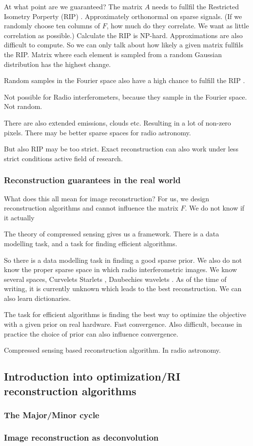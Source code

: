 At what point are we guaranteed? The matrix $A$ needs to fullfil the Restricted Isometry Porperty (RIP) \cite{candes2006robust,donoho2006compressed}.
Approximately orthonormal on sparse signals. (If we randomly choose ten columns of $F$, how much do they correlate. We want as little correlation as possible.)
Calculate the RIP is NP-hard\cite{tillmann2013computational}. Approximations are also difficult to compute\cite{natarajan2014computational}.
So we can only talk about how likely a given matrix fullfils the RIP. Matrix where each element is sampled from a random Gaussian distributîon has the highest change.

Random samples in the Fourier space also have a high chance to fulfill the RIP \cite{haviv2017restricted}.

Not possible for Radio interferometers, because they sample in the Fourier space. Not random.

There are also extended emissions, clouds etc. Resulting in a lot of non-zero pixels. There may be better sparse spaces for radio astronomy.

But also RIP may be too strict. Exact reconstruction can also work under less strict conditions\cite{candes2011probabilistic} active field of research.

\subsubsection{Reconstruction guarantees in the real world}

What does this all mean for image reconstruction?
For us, we design reconstruction algorithms and cannot influence the matrix $F$. We do not know if it actually 

The theory of compressed sensing gives us a framework. There is a data modelling task, and a task for finding efficient algorithms.

So there is a data modelling task in finding a good sparse prior.
We also do not know the proper sparse space in which radio interferometric images. We know several spaces, Curvelets \cite{starck2003astronomical} Starlets \cite{starck2015starlet}, Daubechies wavelets \cite{carrillo2012sparsity}. As of the time of writing, it is currently unknown which leads to the best reconstruction.
We can also learn dictionaries.

The task for efficient algorithms is finding the best way to optimize the objective with a given prior on real hardware. Fast convergence. Also difficult, because in practice the choice of prior can also influence convergence.


Compressed sensing based reconstruction algorithm. In radio astronomy.








\subsection{Introduction into optimization/RI reconstruction algorithms}\label{intro2:rec}

\subsubsection{The Major/Minor cycle}\label{intro2:opt:cycle}

\subsubsection{Image reconstruction as deconvolution}
